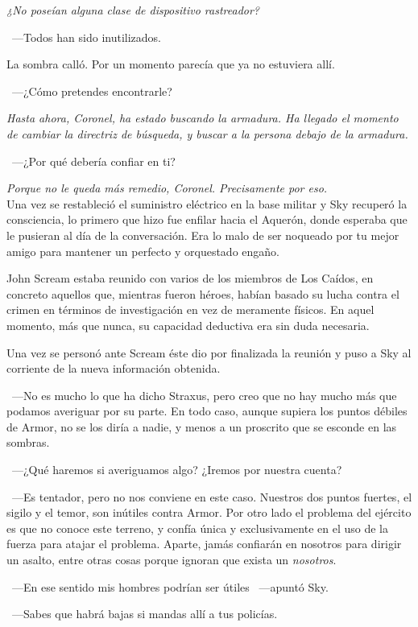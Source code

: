 \emph{¿No poseían alguna clase de dispositivo rastreador?}

~---Todos han sido inutilizados.

La sombra calló. Por un momento parecía que ya no estuviera allí.

~---¿Cómo pretendes encontrarle?

\emph{Hasta ahora, Coronel, ha estado buscando la armadura. Ha llegado el momento de cambiar la directriz de búsqueda, y buscar a la persona debajo de la armadura.}

~---¿Por qué debería confiar en ti?

\emph{Porque no le queda más remedio, Coronel. Precisamente por eso.}\\

\noindent{}Una vez se restableció el suministro eléctrico en la base militar y Sky recuperó la consciencia, lo primero que hizo fue enfilar hacia el Aquerón, donde esperaba que le pusieran al día de la conversación. Era lo malo de ser noqueado por tu mejor amigo para mantener un perfecto y orquestado engaño.

John Scream estaba reunido con varios de los miembros de Los Caídos, en concreto aquellos que, mientras fueron héroes, habían basado su lucha contra el crimen en términos de investigación en vez de meramente físicos. En aquel momento, más que nunca, su capacidad deductiva era sin duda necesaria.

Una vez se personó ante Scream éste dio por finalizada la reunión y puso a Sky al corriente de la nueva información obtenida.

~---No es mucho lo que ha dicho Straxus, pero creo que no hay mucho más que podamos averiguar por su parte. En todo caso, aunque supiera los puntos débiles de Armor, no se los diría a nadie, y menos a un proscrito que se esconde en las sombras.

~---¿Qué haremos si averiguamos algo? ¿Iremos por nuestra cuenta?

~---Es tentador, pero no nos conviene en este caso. Nuestros dos puntos fuertes, el sigilo y el temor, son inútiles contra Armor. Por otro lado el problema del ejército es que no conoce este terreno, y confía única y exclusivamente en el uso de la fuerza para atajar el problema. Aparte, jamás confiarán en nosotros para dirigir un asalto, entre otras cosas porque ignoran que exista un \emph{nosotros}.

~---En ese sentido mis hombres podrían ser útiles ~---apuntó Sky.

~---Sabes que habrá bajas si mandas allí a tus policías.

